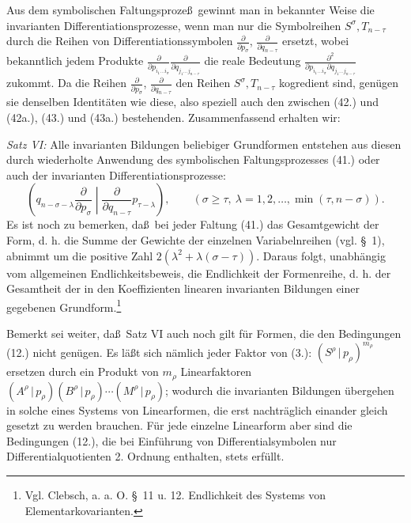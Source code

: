 \documentclass[11pt]{article}
\providecommand{\pair}[2]{(#1\,|\,#2)}
\begin{document}
Aus dem symbolischen Faltungsproze\ss\ gewinnt man in bekannter Weise die invarianten Differentiationsprozesse, wenn man nur die Symbolreihen $S^\sigma,T_{n-\tau}$ durch die Reihen von Differentiationssymbolen $\frac{\partial}{\partial p_\sigma}$, $\frac{\partial}{\partial q_{n-\tau}}$ ersetzt, wobei bekanntlich jedem Produkte $\frac{\partial}{\partial p_{i_1\ldots i_\sigma}}\frac{\partial}{\partial q_{j_1\ldots j_{n-\tau}}}$ die reale Bedeutung $\frac{\partial^2}{\partial p_{i_1\ldots i_\sigma}\partial q_{j_1\ldots j_{n-\tau}}}$ zukommt. Da die Reihen $\frac{\partial}{\partial p_\sigma}$, $\frac{\partial}{\partial q_{n-\tau}}$ den Reihen $S^\sigma,T_{n-\tau}$ kogredient sind, gen\"ugen sie denselben Identit\"aten wie diese, also speziell auch den zwischen (42.) und (42a.), (43.) und (43a.) bestehenden. Zusammenfassend erhalten wir:

\emph{Satz VI:} Alle invarianten Bildungen beliebiger Grundformen entstehen aus diesen durch wiederholte Anwendung des symbolischen Faltungsprozesses (41.) oder auch der invarianten Differentiationsprozesse:
\begin{equation}
 \left(q_{n-\sigma-\lambda}\frac{\partial}{\partial p_\sigma}\middle|\frac{\partial}{\partial q_{n-\tau}}p_{\tau-\lambda}\right),
 \qquad(\sigma\ge\tau,\ \lambda=1,2,\ldots,\min(\tau,n-\sigma)).
\tag{45}
\end{equation}
Es ist noch zu bemerken, da\ss\ bei jeder Faltung (41.) das Gesamtgewicht der Form, d. h. die Summe der Gewichte der einzelnen Variabelnreihen (vgl. \S\ 1), abnimmt um die positive Zahl $2(\lambda^2+\lambda(\sigma-\tau))$. Daraus folgt, unabh\"angig vom allgemeinen Endlichkeitsbeweis, die Endlichkeit der Formenreihe, d. h. der Gesamtheit der in den Koeffizienten linearen invarianten Bildungen einer gegebenen Grundform.\footnote{Vgl. Clebsch, a. a. O. \S\ 11 u. 12. Endlichkeit des Systems von Elementarkovarianten.}

Bemerkt sei weiter, da\ss\ Satz VI auch noch gilt f\"ur Formen, die den Bedingungen (12.) nicht gen\"ugen. Es l\"a\ss t sich n\"amlich jeder Faktor von (3.): $\pair{S^\rho}{p_\rho}^{m_\rho}$ ersetzen durch ein Produkt von $m_\rho$ Linearfaktoren $\pair{A^\rho}{p_\rho}\pair{B^\rho}{p_\rho}\cdots\pair{M^\rho}{p_\rho}$; wodurch die invarianten Bildungen \"ubergehen in solche eines Systems von Linearformen, die erst nachtr\"aglich einander gleich gesetzt zu werden brauchen. F\"ur jede einzelne Linearform aber sind die Bedingungen (12.), die bei Einf\"uhrung von Differentialsymbolen nur Differentialquotienten 2. Ordnung enthalten, stets erf\"ullt.
\end{document}
